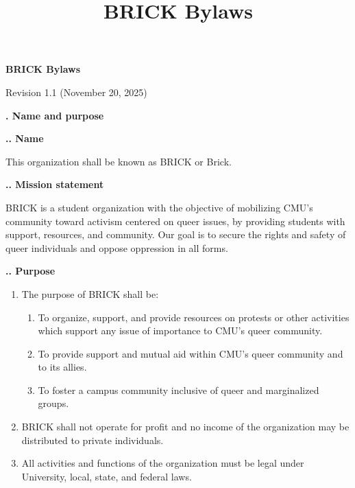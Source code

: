 \documentclass[11pt]{article}
\title{BRICK Bylaws}
\newcounter{h1}
\newcounter{h2}[h1]
\newcounter{h3}[h2]
\begin{document}
\newcommand{\tab}[1]{\stepcounter{h1}\par\large\textbf{\arabic{h1}. #1}\normalsize\par}
\newcommand{\subtab}[1]{\stepcounter{h2}\par\textbf{\arabic{h1}.\arabic{h2}. #1}\par}
\newcommand{\subsubtab}[1]{\stepcounter{h3}\par\small\textbf{\arabic{h1}.\arabic{h2}.\arabic{h3}. #1}\normalsize\par}
\renewcommand{\labelenumi}{\arabic{enumi}.} 
\renewcommand{\labelenumii}{\arabic{enumi}.\arabic{enumii}.}
\renewcommand{\labelenumiii}{\arabic{enumi}.\arabic{enumii}.\arabic{enumiii}.}
\renewcommand{\labelenumiv}{\arabic{enumi}.\arabic{enumii}.\arabic{enumiii}.\arabic{enumiv}.}

\raggedright


\begin{center}
\Large
\textbf{BRICK Bylaws}

\normalsize
Revision 1.1 (November 20, 2025)
\end{center}


\tab{Name and purpose}

\subtab{Name}

This organization shall be known as BRICK or Brick.

\subtab{Mission statement}

BRICK is a student organization with the objective of mobilizing CMU's community toward activism centered on queer issues, by providing students with support, resources, and community. Our goal is to secure the rights and safety of queer individuals and oppose oppression in all forms.

\subtab{Purpose}

\begin{enumerate}
  \item The purpose of BRICK shall be:  
  \begin{enumerate}
    \item To organize, support, and provide resources on protests or other activities which support any issue of importance to CMU's queer community.  
    \item To provide support and mutual aid within CMU's queer community and to its allies.  
    \item To foster a campus community inclusive of queer and marginalized groups.  
  \end{enumerate}
  \item BRICK shall not operate for profit and no income of the organization may be distributed to private individuals.  
  \item All activities and functions of the organization must be legal under University, local, state, and federal laws.
\end{enumerate}
\end{document}
